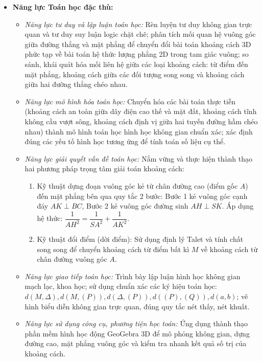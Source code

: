 \documentclass[12pt, a4paper]{article}
\begin{document}
\begin{itemize}[leftmargin=1.2cm]
    \item \textbf{Năng lực Toán học đặc thù:}
    \begin{itemize}[leftmargin=0.6cm]
        \item \textit{Năng lực tư duy và lập luận toán học:} Rèn luyện tư duy không gian trực quan và tư duy suy luận logic chặt chẽ; phân tích mối quan hệ vuông góc giữa đường thẳng và mặt phẳng để chuyển đổi bài toán khoảng cách 3D phức tạp về bài toán hệ thức lượng phẳng 2D trong tam giác vuông; so sánh, khái quát hóa mối liên hệ giữa các loại khoảng cách: từ điểm đến mặt phẳng, khoảng cách giữa các đối tượng song song và khoảng cách giữa hai đường thẳng chéo nhau.
        \item \textit{Năng lực mô hình hóa toán học:} Chuyển hóa các bài toán thực tiễn (khoảng cách an toàn giữa dây điện cao thế và mặt đất, khoảng cách tĩnh không cầu vượt sông, khoảng cách định vị giữa hai tuyến đường hầm chéo nhau) thành mô hình toán học hình học không gian chuẩn xác; xác định đúng các yếu tố hình học tương ứng để tính toán số liệu cụ thể.
        \item \textit{Năng lực giải quyết vấn đề toán học:} Nắm vững và thực hiện thành thạo hai phương pháp trọng tâm giải toán khoảng cách:
        \begin{enumerate}
            \item Kỹ thuật dựng đoạn vuông góc kẻ từ chân đường cao (điểm gốc $A$) đến mặt phẳng bên qua quy tắc 2 bước: Bước 1 kẻ vuông góc cạnh đáy $AK \perp BC$, Bước 2 kẻ vuông góc đường sinh $AH \perp SK$. Áp dụng hệ thức: $\dfrac{1}{AH^2} = \dfrac{1}{SA^2} + \dfrac{1}{AK^2}$.
            \item Kỹ thuật đổi điểm (dời điểm): Sử dụng định lý Talet và tính chất song song để chuyển khoảng cách từ điểm bất kì $M$ về khoảng cách từ chân đường vuông góc $A$.
        \end{enumerate}
        \item \textit{Năng lực giao tiếp toán học:} Trình bày lập luận hình học không gian mạch lạc, khoa học; sử dụng chuẩn xác các ký hiệu toán học: $d(M, \Delta), d(M, (P)), d(\Delta, (P)), d((P), (Q)), d(a, b)$; vẽ hình biểu diễn không gian trực quan, đúng quy tắc nét thấy, nét khuất.
        \item \textit{Năng lực sử dụng công cụ, phương tiện học toán:} Ứng dụng thành thạo phần mềm hình học động GeoGebra 3D để mô phỏng không gian, dựng đường cao, mặt phẳng vuông góc và kiểm tra nhanh kết quả số trị của khoảng cách.
    \end{itemize}


\end{itemize}
\end{document}
